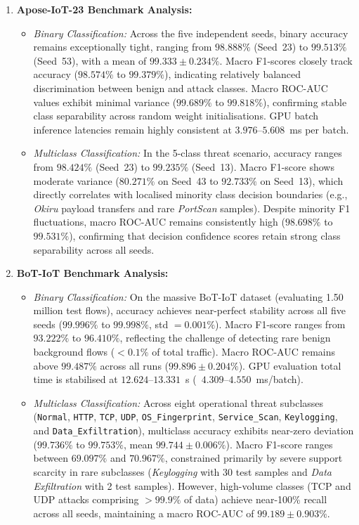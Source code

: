 \documentclass[a4paper,fleqn]{cas-sc}
\begin{document}
\begin{enumerate}
    \item \textbf{Apose-IoT-23 Benchmark Analysis:}
    \begin{itemize}
        \item \textit{Binary Classification:} Across the five independent seeds, binary accuracy remains exceptionally tight, ranging from $98.888\%$ (Seed~23) to $99.513\%$ (Seed~53), with a mean of $99.333 \pm 0.234\%$. Macro F1-scores closely track accuracy ($98.574\%$ to $99.379\%$), indicating relatively balanced discrimination between benign and attack classes. Macro ROC-AUC values exhibit minimal variance ($99.689\%$ to $99.818\%$), confirming stable class separability across random weight initialisations. GPU batch inference latencies remain highly consistent at $3.976$--$5.608$~ms per batch.
        \item \textit{Multiclass Classification:} In the 5-class threat scenario, accuracy ranges from $98.424\%$ (Seed~23) to $99.235\%$ (Seed~13). Macro F1-score shows moderate variance ($80.271\%$ on Seed~43 to $92.733\%$ on Seed~13), which directly correlates with localised minority class decision boundaries (e.g., \textit{Okiru} payload transfers and rare \textit{PortScan} samples). Despite minority F1 fluctuations, macro ROC-AUC remains consistently high ($98.698\%$ to $99.531\%$), confirming that decision confidence scores retain strong class separability across all seeds.
    \end{itemize}

    \item \textbf{BoT-IoT Benchmark Analysis:}
    \begin{itemize}
        \item \textit{Binary Classification:} On the massive BoT-IoT dataset (evaluating 1.50 million test flows), accuracy achieves near-perfect stability across all five seeds ($99.996\%$ to $99.998\%$, std $= 0.001\%$). Macro F1-score ranges from $93.222\%$ to $96.410\%$, reflecting the challenge of detecting rare benign background flows ($<0.1\%$ of total traffic). Macro ROC-AUC remains above $99.487\%$ across all runs ($99.896 \pm 0.204\%$). GPU evaluation total time is stabilised at $12.624$--$13.331$~s (~$4.309$--$4.550$~ms/batch).
        \item \textit{Multiclass Classification:} Across eight operational threat subclasses (\texttt{Normal}, \texttt{HTTP}, \texttt{TCP}, \texttt{UDP}, \texttt{OS\_Fingerprint}, \texttt{Service\_Scan}, \texttt{Keylogging}, and \texttt{Data\_Exfiltration}), multiclass accuracy exhibits near-zero deviation ($99.736\%$ to $99.753\%$, mean $99.744 \pm 0.006\%$). Macro F1-score ranges between $69.097\%$ and $70.967\%$, constrained primarily by severe support scarcity in rare subclasses (\textit{Keylogging} with 30 test samples and \textit{Data Exfiltration} with 2 test samples). However, high-volume classes (TCP and UDP attacks comprising $>99.9\%$ of data) achieve near-100\% recall across all seeds, maintaining a macro ROC-AUC of $99.189 \pm 0.903\%$.
    \end{itemize}


\end{enumerate}
\end{document}
